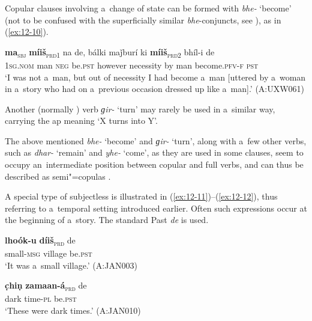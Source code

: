 Copular clauses involving a~change of state can be formed with \textit{bhe-} `become' (not to be confused with the superficially similar \textit{bhe}-conjuncts, see ), as in (\ref{ex:12-10}).

\ea
\label{ex:12-10}
\gll {\ob}\textbf{ma}{\cb}\textsubscript{\textsc{\upshape sbj}} {\ob}\textbf{míiš}{\cb}\textsubscript{\textsc{\upshape prd1}} na de, bálki maǰburí ki {\ob}\textbf{míiš}{\cb}\textsubscript{\textsc{\upshape prd2}} bhíl-i de \\
\textsc{1sg.nom} man \textsc{neg} be.\textsc{pst}  however necessity by man become.\textsc{pfv-f} \textsc{pst} \\
\glt `I was not a~man, but out of necessity I had become a~man [uttered by a~woman in a~story who had on a~previous occasion dressed up like a~man].' (A:UXW061)
\z

Another (normally ) verb \textit{ɡir-} `turn' may rarely be used in a~similar way, carrying the ap meaning `X turns into Y'.



The above mentioned \textit{bhe-} `become' and \textit{ɡir-} `turn', along with a~few other verbs, such as \textit{dhar-} `remain' and \textit{yhe-} `come', as they are used in some clauses, seem to occupy an~intermediate position between copular and full verbs, and can thus be described as semi"=copulas \citep[5--6]{pustet2003}. 



A special type of subjectless  is illustrated in (\ref{ex:12-11})--(\ref{ex:12-12}), thus referring to a~temporal setting introduced earlier. Often such expressions occur at the beginning of a~story. The standard Past  \textit{de} is used.

\begin{exe}
\ex
\label{ex:12-11}
\gll {\ob}\textbf{lhoók-u} \textbf{díiš}{\cb}\textsubscript{\textsc{\upshape prd}} de \\
small-\textsc{msg} village be.\textsc{pst} \\
\glt `It was a~small village.' (A:JAN003)
\end{exe}
\begin{exe}
\ex
\label{ex:12-12}
\gll {\ob}\textbf{c̣hiṇ} \textbf{zamaan-á}{\cb}\textsubscript{\textsc{\upshape prd}} de \\
dark time-\textsc{pl} be.\textsc{pst} \\
\glt `These were dark times.' (A:JAN010)
\end{exe}


